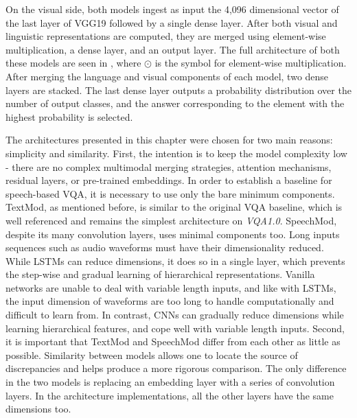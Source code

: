 \documentclass[letterpaper]{article} %
\begin{document}
On the visual side, both models ingest as input the 4,096 dimensional vector of the last layer of VGG19 \cite{vgg16} followed by a single dense layer. After both visual and linguistic representations are computed, they are merged using element-wise multiplication, a dense layer, and an output layer. The full architecture of both these models are seen in , where $\displaystyle\odot$ is the symbol for element-wise multiplication. After merging the language and visual components of each model, two dense layers are stacked. The last dense layer outputs a probability distribution over the number of output classes, and the answer corresponding to the element with the highest probability is selected.

The architectures presented in this chapter were chosen for two main reasons: simplicity and similarity. First, the intention is to keep the model complexity low - there are no complex multimodal merging strategies, attention mechanisms, residual layers, or pre-trained embeddings. In order to establish a baseline for speech-based VQA, it is necessary to use only the bare minimum components. TextMod, as mentioned before, is similar to the original VQA baseline, which is well referenced and remains the simplest architecture on \textit{VQA1.0}. SpeechMod, despite its many convolution layers, uses minimal components too. Long inputs sequences such as audio waveforms must have their dimensionality reduced. While LSTMs can reduce dimensions, it does so in a single layer, which prevents the step-wise and gradual learning of hierarchical representations. Vanilla networks are unable to deal with variable length inputs, and like with LSTMs, the input dimension of waveforms are too long to handle computationally and difficult to learn from. In contrast, CNNs can gradually reduce dimensions while learning hierarchical features, and cope well with variable length inputs. Second, it is important that TextMod and SpeechMod differ from each other as little as possible. Similarity between models allows one to locate the source of discrepancies and helps produce a more rigorous comparison. The only difference in the two models is replacing an embedding layer with a series of convolution layers. In the architecture implementations, all the other layers have the same dimensions too.
\end{document}
